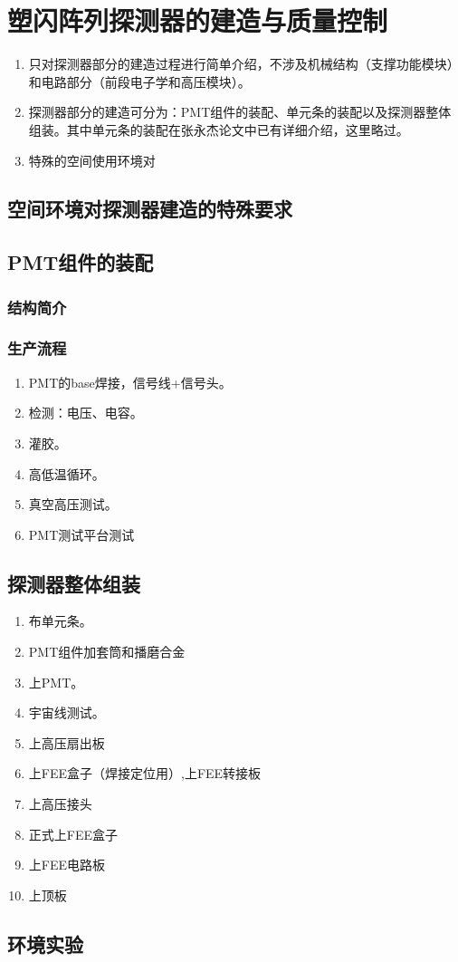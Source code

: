 \chapter{塑闪阵列探测器的建造与质量控制}
\label{ch:construction}
\begin{enumerate}
	\item 只对探测器部分的建造过程进行简单介绍，不涉及机械结构（支撑功能模块）和电路部分（前段电子学和高压模块）。
	\item 探测器部分的建造可分为：PMT组件的装配、单元条的装配以及探测器整体组装。其中单元条的装配在张永杰论文中已有详细介绍，这里略过。
	\item 特殊的空间使用环境对
\end{enumerate}

\section{空间环境对探测器建造的特殊要求}

\section{PMT组件的装配}
\label{sec:construction:pmt_assembly}
\subsection{结构简介}
\subsection{生产流程}
\begin{enumerate}
	\item PMT的base焊接，信号线+信号头。
	\item 检测：电压、电容。
	\item 灌胶。
	\item 高低温循环。
	\item 真空高压测试。
	\item PMT测试平台测试
\end{enumerate}

\section{探测器整体组装}
\label{sec:construction:psd_assembly}
\begin{enumerate}
	\item 布单元条。
	\item PMT组件加套筒和播磨合金
	\item 上PMT。
	\item 宇宙线测试。
	\item 上高压扇出板
	\item 上FEE盒子（焊接定位用）,上FEE转接板
	\item 上高压接头
	\item 正式上FEE盒子
	\item 上FEE电路板
	\item 上顶板
\end{enumerate}

\section{环境实验}
